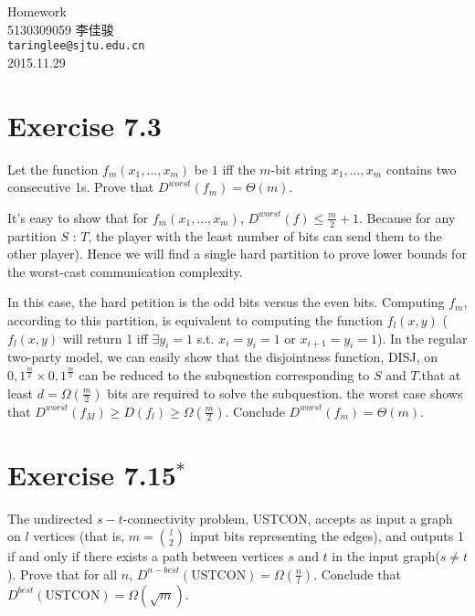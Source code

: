 \documentclass[10pt, fleqn, a4paper]{report}
\begin{document}
\begin{titlepage}
\vspace*{40mm}
\begin{center}
{\Huge Homework }\\[30mm]

{\Large 5130309059 \quad \quad 李佳骏}\\[3mm]
\texttt{taringlee@sjtu.edu.cn}\\[10mm]

2015.11.29

\end{center}
\end{titlepage}

\section*{Exercise 7.3}
Let the function $f_m(x_1,...,x_m)$ be $1$ iff the $m$-bit string $x_1,...,x_m$ contains two consecutive 1s. Prove that $D^{worst}(f_m) = \Theta(m)$.

It's easy to show that for $f_m(x_1,...,x_m)$, $D^{worst}(f) \leq \frac{m}{2} + 1$. Because for any partition $S$ : $T$, the player with the least number of bits can send them to the other player). Hence we will find a single hard partition to prove lower bounds for the worst-cast communication complexity.

In this case, the hard petition is the odd bits versus the even bits. Computing $f_m$, according to this partition, is equivalent to computing the function $f_l(x,y)$ ($f_l(x,y)$ will return 1 iff $\exists y_i = 1$ s.t. $x_i = y_i = 1$ or $x_{i+1} = y_i = 1$). In the regular two-party model, we can easily show that the disjointness function, DISJ, on ${0,1}^{\frac{m}{2}} \times {0,1}^{\frac{m}{2}}$ can be reduced to the subquestion corresponding to $S$ and $T$.that at least $d = \Omega(\frac{m}{2})$ bits are required to solve the subquestion. the worst case shows that $D^{worst}(f_M) \geq D(f_l) \geq \Omega(\frac{m}{2})$. Conclude $D^{worst}(f_m) = \Theta(m)$.

\section*{Exercise 7.15$^{*}$}
The undirected $s-t$-connectivity problem, USTCON, accepts as input a graph on $l$ vertices (that is, $m = \binom{l}{2}$ input bits representing the edges), and outputs 1 if and only if there exists a path between vertices $s$ and $t$ in the input graph($s \neq t$). Prove that for all $n$, $D^{n-best}(\mathrm{USTCON}) = \Omega(\frac{n}{l})$. Conclude that $D^{best}(\mathrm{USTCON}) = \Omega(\sqrt{m})$.
\end{document}
